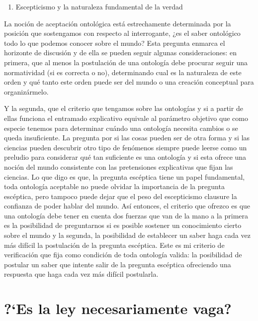 \documentclass[]{book}
\begin{document}
\begin{enumerate}
\def\labelenumi{\arabic{enumi}.}
\item
  Escepticismo y la naturaleza fundamental de la verdad
\end{enumerate}

La noción de aceptación ontológica está estrechamente determinada por la
posición que sostengamos con respecto al interrogante, ¿es el saber
ontológico todo lo que podemos conocer sobre el mundo? Esta pregunta
enmarca el horizonte de discusión y de ella se pueden seguir algunas
consideraciones: en primera, que al menos la postulación de una
ontología debe procurar seguir una normatividad (si es correcta o no),
determinando cual es la naturaleza de este orden y qué tanto este orden
puede ser del mundo o una creación conceptual para organizármelo.

Y la segunda, que el criterio que tengamos sobre las ontologías y si a
partir de ellas funciona el entramado explicativo equivale al parámetro
objetivo que como especie tenemos para determinar cuándo una ontología
necesita cambios o se queda insuficiente. La pregunta por si las cosas
pueden ser de otra forma y si las ciencias pueden descubrir otro tipo de
fenómenos siempre puede leerse como un preludio para considerar qué tan
suficiente es una ontología y si esta ofrece una noción del mundo
consistente con las pretensiones explicativas que fijan las ciencias. Lo
que digo es que, la pregunta escéptica tiene un papel fundamental, toda
ontología aceptable no puede olvidar la importancia de la pregunta
escéptica, pero tampoco puede dejar que el peso del escepticismo
clausure la confianza de poder hablar del mundo. Así entonces, el
criterio que ofrezco es que una ontología debe tener en cuenta dos
fuerzas que van de la mano a la primera es la posibilidad de
preguntarnos si es posible sostener un conocimiento cierto sobre el
mundo y la segunda, la posibilidad de establecer un saber haga cada vez
más difícil la postulación de la pregunta escéptica. Este es mi criterio
de verificación que fija como condición de toda ontología valida: la
posibilidad de postular un saber que intente salir de la pregunta
escéptica ofreciendo una respuesta que haga cada vez más difícil
postularla.

\chapter{\texorpdfstring{\textbf{?`Es la ley necesariamente
vaga?}}{?`Es la ley necesariamente vaga?}}\label{es-la-ley-necesariamente-vaga}
\end{document}

